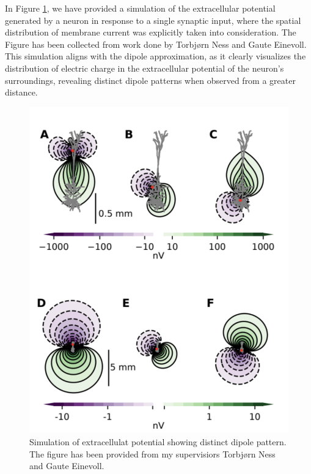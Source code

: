 \documentclass[a4paper, UKenglish, 11pt]{uiomaster}
\begin{document}
In Figure \ref{fig:dipole_pattern}, we have provided a simulation of the extracellular potential generated by a neuron in response to a single synaptic input, where the spatial distribution of membrane current was explicitly taken into consideration. The Figure has been collected from work done by Torbjørn Ness and Gaute Einevoll. This simulation aligns with the dipole approximation, as it clearly visualizes the distribution of electric charge in the extracellular potential of the neuron's surroundings, revealing distinct dipole patterns when observed from a greater distance.

\begin{figure}
    \centering
    \includegraphics[width=\linewidth]{figures/dipole_pattern.png}
    \caption{Simulation of extracellulat potential showing distinct dipole pattern. The figure has been provided from my supervisiors Torbjørn Ness and Gaute Einevoll.}
    \label{fig:dipole_pattern}
\end{figure}
\end{document}
